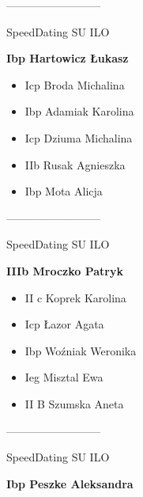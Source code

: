 \documentclass[a4paper,10pt]{article}
\begin{document}
\begin{multicols}{3}
\begin{minipage}[l]{\textwidth}
\begin{itemize}
    \end{itemize}



\end{minipage}



\begin{minipage}[l]{\textwidth}
--------------------------

  \footnotesize{SpeedDating SU ILO}

  \bfseries{Ibp Hartowicz Łukasz}

  \begin{itemize}
    \item Icp Broda Michalina
    \item Ibp Adamiak Karolina
    \item Icp Dziuma Michalina
    \item IIb Rusak Agnieszka
    \item Ibp Mota Alicja

    \end{itemize}



\end{minipage}



\begin{minipage}[l]{\textwidth}
--------------------------

  \footnotesize{SpeedDating SU ILO}

  \bfseries{IIIb Mroczko Patryk}

  \begin{itemize}
    \item II c Koprek Karolina
    \item Icp Łazor Agata
    \item Ibp Woźniak Weronika
    \item Ieg Misztal Ewa
    \item II B Szumska Aneta

    \end{itemize}



\end{minipage}



\begin{minipage}[l]{\textwidth}
--------------------------

  \footnotesize{SpeedDating SU ILO}

  \bfseries{Ibp Peszke Aleksandra}


\end{minipage}
\end{multicols}
\end{document}
